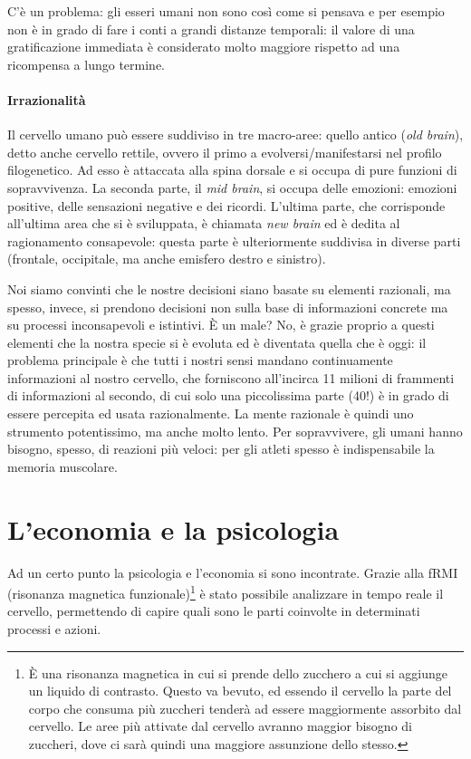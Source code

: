 C'è un problema: gli esseri umani non sono così come si pensava e per esempio
non è in grado di fare i conti a grandi distanze temporali: il valore di una
gratificazione immediata è considerato molto maggiore rispetto ad una
ricompensa a lungo termine.

\paragraph*{Irrazionalità} 
Il cervello umano può essere suddiviso in tre macro-aree: quello
antico (\textit{old brain}), detto anche cervello rettile, ovvero il primo a
evolversi/manifestarsi nel profilo filogenetico. Ad esso è attaccata alla
spina dorsale e si occupa di pure funzioni di sopravvivenza.
La seconda parte, il \textit{mid brain}, si occupa delle emozioni: emozioni
positive, delle sensazioni negative e dei ricordi.
L'ultima parte, che corrisponde all'ultima area che si è sviluppata, è chiamata
\textit{new brain} ed è dedita al ragionamento consapevole: questa parte è
ulteriormente suddivisa in diverse parti (frontale, occipitale, ma anche
emisfero destro e sinistro).

Noi siamo convinti che le nostre decisioni siano basate su elementi razionali,
ma spesso, invece, si prendono decisioni non sulla base di informazioni
concrete ma su processi inconsapevoli e istintivi.
È un male? No, è grazie proprio a questi elementi che la nostra specie si è
evoluta ed è diventata quella che è oggi: il problema principale è che tutti i
nostri sensi mandano continuamente informazioni al nostro cervello, che
forniscono all'incirca 11 milioni di frammenti di informazioni al secondo, di
cui solo una piccolissima parte (40!) è in grado di essere percepita ed usata
razionalmente. La mente razionale è quindi uno strumento potentissimo, ma anche
molto lento. Per sopravvivere, gli umani hanno bisogno, spesso, di reazioni più
veloci: per gli atleti spesso è indispensabile la memoria muscolare.

\section{L'economia e la psicologia}

Ad un certo punto la psicologia e l'economia si sono incontrate.
Grazie alla fRMI (risonanza magnetica funzionale)\footnote{È una
risonanza magnetica in cui si prende dello zucchero a cui si aggiunge un
liquido di contrasto. Questo va bevuto, ed essendo il cervello la parte del
corpo che consuma più zuccheri tenderà ad essere maggiormente assorbito dal
cervello. Le aree più attivate dal cervello avranno maggior bisogno di
zuccheri, dove ci sarà quindi una maggiore assunzione dello stesso.} è stato
possibile analizzare in tempo reale il cervello, permettendo di capire quali
sono le parti coinvolte in determinati processi e azioni.

